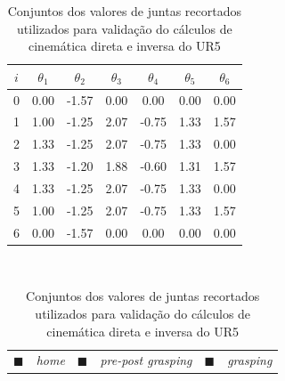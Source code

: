 \begin{table}[htp!]
	\centering
	\caption{Conjuntos dos valores de juntas recortados utilizados para validação do cálculos de cinemática direta e 
		inversa do UR5
	}
	\label{tab:conjuntos-de-valores-de-juntas-recortado}
	\begin{tabular}{c|c|c|c|c|c|c}
		\hline
		\rowcolor{white} 					$i$ & $\theta_{1} $ & $\theta_{2}$ & $\theta_{3}$ & $\theta_{4}$ & $\theta_{5}$ & $\theta_{6}$ \\ 
		\hline 
		\rowcolor{home-gray} 				0  &    0.00       &     -1.57    &     0.00     &     0.00     &     0.00     &     0.00     \\ 
		\hline 
		\rowcolor{pre-post-grasping-gray} 	1  &    1.00       &     -1.25    &     2.07     &     -0.75    &     1.33     &     1.57     \\ 
		\hline 
		\rowcolor{pre-post-grasping-gray} 	2  &    1.33       &     -1.25    &     2.07     &     -0.75    &     1.33     &     0.00     \\ 
		\hline 
		\rowcolor{grasping-gray} 		    3  &    1.33       &     -1.20    &     1.88     &     -0.60    &     1.31     &     1.57     \\ 
		\hline 
		\rowcolor{pre-post-grasping-gray} 	4  &    1.33       &     -1.25    &     2.07     &     -0.75    &     1.33     &     0.00     \\ 
		\hline
		\rowcolor{pre-post-grasping-gray} 	5  &    1.00       &     -1.25    &     2.07     &     -0.75    &     1.33     &     1.57     \\ 
		\hline
		\rowcolor{home-gray} 				6  &    0.00       &     -1.57    &     0.00     &     0.00     &     0.00     &     0.00     \\ 
		\hline
	\end{tabular}
	\\
	\begin{tabular}{cccccc}
		\textcolor{home-gray}{$\blacksquare$} & \textit{home} &
		\textcolor{pre-post-grasping-gray}{$\blacksquare$} & \textit{pre-post grasping} &
		\textcolor{grasping-gray}{$\blacksquare$} & \textit{grasping} \\
	\end{tabular}
\end{table}

